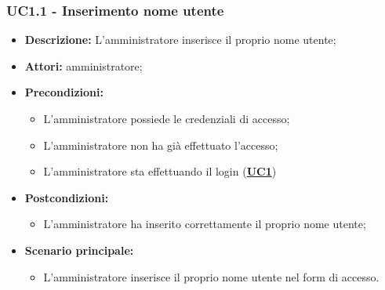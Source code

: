 \documentclass[5pt]{article}
\begin{document}
\subsubsection{UC1.1 - Inserimento nome utente}
\label{sec:UC1.1}
\begin{itemize}
	\item \textbf{Descrizione:} L’amministratore inserisce il proprio nome utente;
	\item \textbf{Attori:} amministratore;
	\item \textbf{Precondizioni:} 
	\begin{itemize}
		\item L’amministratore possiede le credenziali di accesso;
		\item L’amministratore non ha già effettuato l’accesso;
		\item L’amministratore sta effettuando il login (\hyperref[sec:UC1]{\textbf{UC1}})
	\end{itemize}
	\item \textbf{Postcondizioni:} 
	\begin{itemize}
		\item L’amministratore ha inserito correttamente il proprio nome utente;
	\end{itemize}
	\item \textbf{Scenario principale:} 
	\begin{itemize}
		\item L’amministratore inserisce il proprio nome utente nel form di accesso.
	\end{itemize}
\end{itemize}
\end{document}
